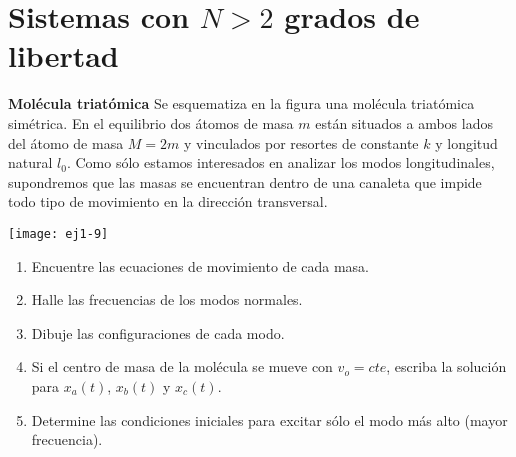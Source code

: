 \section*{Sistemas con \(N> 2\) grados de libertad}


\item
\begin{minipage}[t][2.6cm]{0.75\textwidth}
\textbf{Molécula triatómica}
Se esquematiza en la figura una molécula triatómica simétrica.
En el equilibrio dos átomos de masa $m$ están situados a ambos lados del átomo de masa $M = 2 m$ y vinculados por resortes de constante $k$ y longitud natural $l_0$.
Como sólo estamos interesados en analizar los modos longitudinales, supondremos que las masas se encuentran dentro de una canaleta que impide todo tipo de movimiento en la dirección transversal.
\end{minipage}
\begin{minipage}[c][0cm][t]{0.2\textwidth}
  \texttt{[image: ej1-9]}
\end{minipage}
\begin{enumerate}
	\item Encuentre las ecuaciones de movimiento de cada masa. 
	\item Halle las frecuencias de los modos normales. 
	\item Dibuje las configuraciones de cada modo. 
	\item Si el centro de masa de la molécula se mueve con $v_o=cte$, escriba la solución para $x_a(t)$, $x_b(t)$ y $x_c(t)$.
	\item Determine las condiciones iniciales para excitar sólo el modo más alto (mayor frecuencia).
\end{enumerate}



